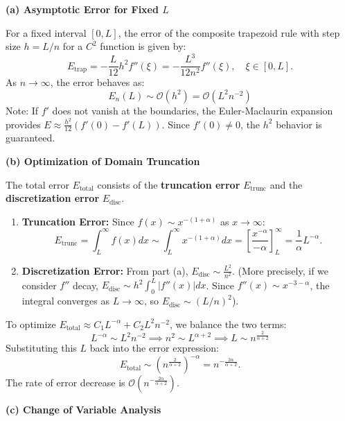 \begin{solution}
\textbf{(a) Asymptotic Error for Fixed $L$}

For a fixed interval $[0, L]$, the error of the composite trapezoid rule with step size $h = L/n$ for a $C^2$ function is given by:
\[ E_{\text{trap}} = -\frac{L}{12} h^2 f''(\xi) = -\frac{L^3}{12 n^2} f''(\xi), \quad \xi \in [0, L]. \]
As $n \to \infty$, the error behaves as:
\[ \boxed{E_n(L) \sim \mathcal{O}(h^2) = \mathcal{O}(L^2 n^{-2})} \]
Note: If $f'$ does not vanish at the boundaries, the Euler-Maclaurin expansion provides $E \approx \frac{h^2}{12}(f'(0) - f'(L))$. Since $f'(0) \neq 0$, the $h^2$ behavior is guaranteed.

\textbf{(b) Optimization of Domain Truncation}

The total error $E_{\text{total}}$ consists of the \textbf{truncation error} $E_{\text{trunc}}$ and the \textbf{discretization error} $E_{\text{disc}}$.
\begin{enumerate}
    \item \textbf{Truncation Error:} Since $f(x) \sim x^{-(1+\alpha)}$ as $x \to \infty$:
    \[ E_{\text{trunc}} = \int_L^\infty f(x) dx \sim \int_L^\infty x^{-(1+\alpha)} dx = \left[ \frac{x^{-\alpha}}{-\alpha} \right]_L^\infty = \frac{1}{\alpha} L^{-\alpha}. \]
    \item \textbf{Discretization Error:} From part (a), $E_{\text{disc}} \sim \frac{L^2}{n^2}$. (More precisely, if we consider $f''$ decay, $E_{\text{disc}} \sim h^2 \int_0^L |f''(x)| dx$. Since $f''(x) \sim x^{-3-\alpha}$, the integral converges as $L \to \infty$, so $E_{\text{disc}} \sim (L/n)^2$).
\end{enumerate}
To optimize $E_{\text{total}} \approx C_1 L^{-\alpha} + C_2 L^2 n^{-2}$, we balance the two terms:
\[ L^{-\alpha} \sim L^2 n^{-2} \implies n^2 \sim L^{\alpha+2} \implies \boxed{L \sim n^{\frac{2}{\alpha+2}}} \]
Substituting this $L$ back into the error expression:
\[ E_{\text{total}} \sim (n^{\frac{2}{\alpha+2}})^{-\alpha} = n^{-\frac{2\alpha}{\alpha+2}}. \]
The rate of error decrease is $\boxed{\mathcal{O}(n^{-\frac{2\alpha}{\alpha+2}})}$.

\textbf{(c) Change of Variable Analysis}


\end{solution}
